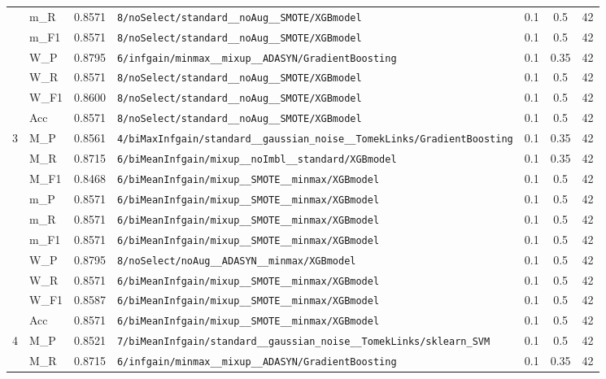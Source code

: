 \begin{table}[htbp]
\begin{tabular}{|c|l|c|>{\ttfamily\footnotesize}p{7.2cm}|c|c|c|}
 & m\_R & 0.8571 & \texttt{8/noSelect/standard\_\_noAug\_\_SMOTE/XGBmodel} & 0.1 & 0.5  & 42 \\ 
 & m\_F1 & 0.8571 & \texttt{8/noSelect/standard\_\_noAug\_\_SMOTE/XGBmodel} & 0.1 & 0.5  & 42 \\ 
 & W\_P & 0.8795 & \texttt{6/infgain/minmax\_\_mixup\_\_ADASYN/GradientBoosting} & 0.1 & 0.35  & 42 \\ 
 & W\_R & 0.8571 & \texttt{8/noSelect/standard\_\_noAug\_\_SMOTE/XGBmodel} & 0.1 & 0.5  & 42 \\ 
 & W\_F1 & 0.8600 & \texttt{8/noSelect/standard\_\_noAug\_\_SMOTE/XGBmodel} & 0.1 & 0.5  & 42 \\ 
 & Acc & 0.8571 & \texttt{8/noSelect/standard\_\_noAug\_\_SMOTE/XGBmodel} & 0.1 & 0.5  & 42 \\ 
\hline
\multirow{10}{*}{3} & M\_P & 0.8561 & \texttt{4/biMaxInfgain/standard\_\_gaussian\_noise\_\_TomekLinks/GradientBoosting} & 0.1 & 0.35  & 42 \\ 
 & M\_R & 0.8715 & \texttt{6/biMeanInfgain/mixup\_\_noImbl\_\_standard/XGBmodel} & 0.1 & 0.35  & 42 \\ 
 & M\_F1 & 0.8468 & \texttt{6/biMeanInfgain/mixup\_\_SMOTE\_\_minmax/XGBmodel} & 0.1 & 0.5  & 42 \\ 
 & m\_P & 0.8571 & \texttt{6/biMeanInfgain/mixup\_\_SMOTE\_\_minmax/XGBmodel} & 0.1 & 0.5  & 42 \\ 
 & m\_R & 0.8571 & \texttt{6/biMeanInfgain/mixup\_\_SMOTE\_\_minmax/XGBmodel} & 0.1 & 0.5  & 42 \\ 
 & m\_F1 & 0.8571 & \texttt{6/biMeanInfgain/mixup\_\_SMOTE\_\_minmax/XGBmodel} & 0.1 & 0.5  & 42 \\ 
 & W\_P & 0.8795 & \texttt{8/noSelect/noAug\_\_ADASYN\_\_minmax/XGBmodel} & 0.1 & 0.5  & 42 \\ 
 & W\_R & 0.8571 & \texttt{6/biMeanInfgain/mixup\_\_SMOTE\_\_minmax/XGBmodel} & 0.1 & 0.5  & 42 \\ 
 & W\_F1 & 0.8587 & \texttt{6/biMeanInfgain/mixup\_\_SMOTE\_\_minmax/XGBmodel} & 0.1 & 0.5  & 42 \\ 
 & Acc & 0.8571 & \texttt{6/biMeanInfgain/mixup\_\_SMOTE\_\_minmax/XGBmodel} & 0.1 & 0.5  & 42 \\ 
\hline
\multirow{10}{*}{4} & M\_P & 0.8521 & \texttt{7/biMeanInfgain/standard\_\_gaussian\_noise\_\_TomekLinks/sklearn\_SVM} & 0.1 & 0.5  & 42 \\ 
 & M\_R & 0.8715 & \texttt{6/infgain/minmax\_\_mixup\_\_ADASYN/GradientBoosting} & 0.1 & 0.35  & 42 \\ 

\end{tabular}
\end{table}
